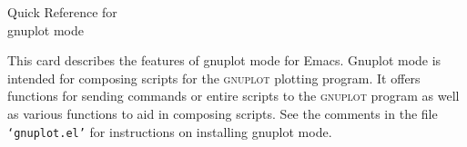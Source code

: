 \documentclass[twocolumn]{article}
\newenvironment{Boxedminipage}%
{\begin{Sbox}\begin{minipage}}%
  {\end{minipage}\end{Sbox}\Ovalbox{\TheSbox}}
\def\file#1{{\texttt{`#1'}}}
\begin{document}
\small

\thispagestyle{empty}

\begin{center}
  \begin{Boxedminipage}{0.75\linewidth}
    \begin{center}
      \vspace{0.01\textheight}
      {\Large Quick Reference for}\\
      \vspace{0.007\textheight}
      {\Large gnuplot mode}
      \vspace{0.01\textheight}
    \end{center}
  \end{Boxedminipage}
\end{center}

\vspace{3ex}

This card describes the features of gnuplot mode for Emacs.  Gnuplot
mode is intended for composing scripts for the \textsc{gnuplot}
plotting program.  It offers functions for sending commands or entire
scripts to the \textsc{gnuplot} program as well as various functions
to aid in composing scripts.  See the comments in the file
\file{gnuplot.el} for instructions on installing gnuplot mode.

\vspace{2ex}
\end{document}
